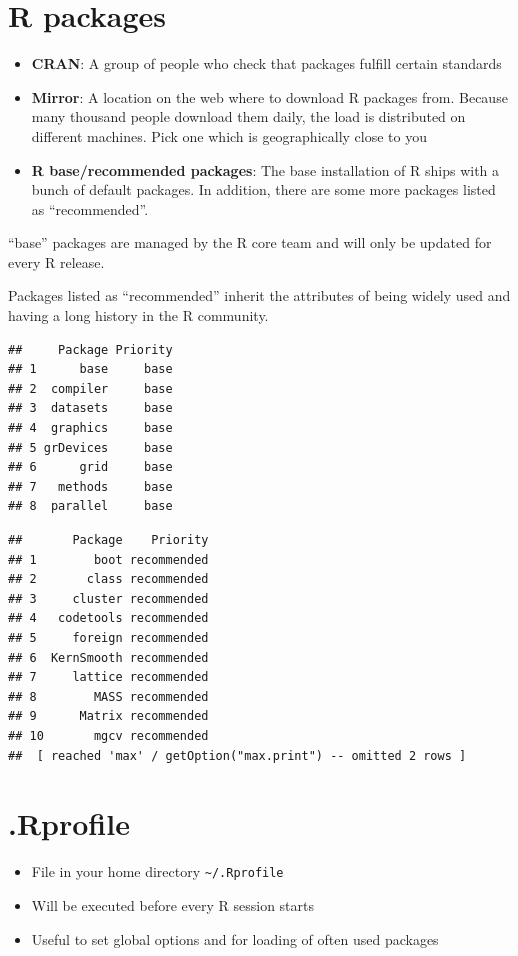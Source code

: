 \documentclass[]{book}
\begin{document}
\hypertarget{r-packages}{%
\section{R packages}\label{r-packages}}

\begin{itemize}
\item
  \textbf{CRAN}: A group of people who check that packages fulfill certain standards
\item
  \textbf{Mirror}: A location on the web where to download R packages from. Because many thousand people download them daily, the load is distributed on different machines. Pick one which is geographically close to you
\item
  \textbf{R base/recommended packages}: The base installation of R ships with a bunch of default packages. In addition, there are some more packages listed as ``recommended''.
\end{itemize}

``base'' packages are managed by the R core team and will only be updated for every R release.

Packages listed as ``recommended'' inherit the attributes of being widely used and having a long history in the R community.

\begin{verbatim}
##     Package Priority
## 1      base     base
## 2  compiler     base
## 3  datasets     base
## 4  graphics     base
## 5 grDevices     base
## 6      grid     base
## 7   methods     base
## 8  parallel     base
\end{verbatim}

\begin{verbatim}
##       Package    Priority
## 1        boot recommended
## 2       class recommended
## 3     cluster recommended
## 4   codetools recommended
## 5     foreign recommended
## 6  KernSmooth recommended
## 7     lattice recommended
## 8        MASS recommended
## 9      Matrix recommended
## 10       mgcv recommended
##  [ reached 'max' / getOption("max.print") -- omitted 2 rows ]
\end{verbatim}

\hypertarget{rprofile}{%
\section{.Rprofile}\label{rprofile}}

\begin{itemize}
\item
  File in your home directory \texttt{\textasciitilde{}/.Rprofile}
\item
  Will be executed before every R session starts
\item
  Useful to set global options and for loading of often used packages
\end{itemize}
\end{document}
